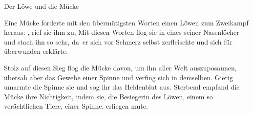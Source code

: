 Der L\"owe und die M\"ucke

Eine M\"ucke forderte mit den \"uberm\"utigsten Worten
einen L\"owen zum Zweikampf heraus: , rief sie ihm
zu,  Mit diesen Worten flog sie in eines seiner
Nasenl\"ocher und stach ihn so sehr, da\SS\ er sich vor
Schmerz selbst zerfleischte und sich f\"ur \"uberwunden
erkl\"arte.

Stolz auf diesen Sieg flog die M\"ucke davon, um ihn aller
Welt auszuposaunen, \"ubersah aber das Gewebe einer Spinne
und verfing sich in demselben. Gierig umarmte die Spinne
sie und sog ihr das Heldenblut aus. Sterbend empfand die
M\"ucke ihre Nichtigkeit, indem sie, die Besiegerin des
L\"owen, einem so ver\"achtlichen Tiere, einer Spinne,
erliegen mu\SS te.
